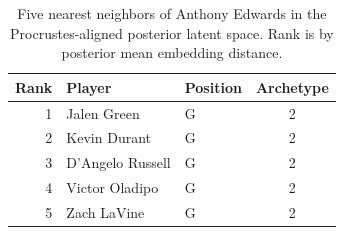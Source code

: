 \begin{table}[htbp]
  \centering\small
  \begin{tabular}{rllc}
    \toprule
    Rank & Player & Position & Archetype \\
    \midrule
    1 & Jalen Green & G & 2 \\
    2 & Kevin Durant & G & 2 \\
    3 & D'Angelo Russell & G & 2 \\
    4 & Victor Oladipo & G & 2 \\
    5 & Zach LaVine & G & 2 \\
    \bottomrule
  \end{tabular}
  \caption{Five nearest neighbors of Anthony Edwards in the Procrustes-aligned posterior latent space. Rank is by posterior mean embedding distance.}
  \label{tab:Anthony_Edwards_neighbors}
\end{table}

